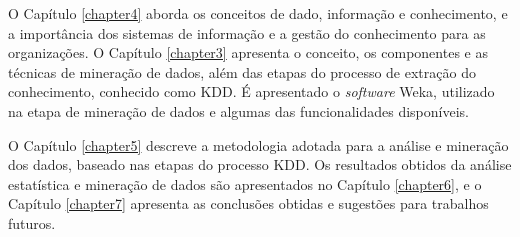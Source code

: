 O Capítulo \ref{chapter4} aborda os conceitos de dado, informação e conhecimento, e a importância dos sistemas de informação e a gestão do conhecimento para as organizações. O Capítulo \ref{chapter3} apresenta o conceito, os componentes e as técnicas de mineração de dados, além das etapas do processo de extração do conhecimento, conhecido como KDD. É apresentado o \textit{software} Weka, utilizado na etapa de mineração de dados e algumas das funcionalidades disponíveis. 

O Capítulo \ref{chapter5} descreve a metodologia adotada para a análise e mineração dos dados, baseado nas etapas do processo KDD. Os resultados obtidos da análise estatística e mineração de dados são apresentados no Capítulo \ref{chapter6}, e o Capítulo \ref{chapter7} apresenta as conclusões obtidas e sugestões para trabalhos futuros.





	

